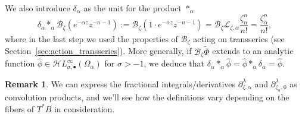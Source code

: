 \documentclass{article}
\newcommand{\singexp}[2]{\mathcal{H}L^\infty_{#1, #2}}
\newcommand{\singexpalg}[1]{\singexp{#1}{\bullet}}
\newcommand{\fracderiv}[3]{\partial^{#1}_{#2, #3}}
\newcommand{\laplace}{\mathcal{L}}
\newcommand{\borel}{\mathcal{B}}
\theoremstyle{definition}
\newtheorem{remark}[definition]{Remark}
\theoremstyle{plain}
\begin{document}
We also introduce $\delta_\alpha$ as the unit for the product $\ast_\alpha$
\[\delta_\alpha\ast_\alpha\borel_\zeta(e^{-\alpha z}z^{-n-1}):=\borel_\zeta(1\cdot e^{-\alpha z} z^{-n-1})=\borel_\zeta\laplace_{\zeta,\alpha}\frac{\zeta_\alpha^n}{n!}=\frac{\zeta_\alpha^n}{n!},\]
where in the last step we used the properties of $\borel_\zeta$ acting on transseries (see Section~\ref{sec:action_transseries}).
More generally, if $\borel_\zeta\tilde{\Phi}$ extends to an analytic function $\hat{\phi}\in\singexpalg{\sigma}(\Omega_\alpha)$ for $\sigma>-1$, we deduce that $\delta_\alpha\ast_\alpha\hat{\phi}=\hat{\phi}\ast_\alpha\delta_\alpha=\hat{\phi}$. 
\begin{remark}
We can express the fractional integrals/derivatives $\fracderiv{\lambda}{\zeta}{\alpha}$ and $\fracderiv{\lambda}{\zeta_\alpha}{0}$ as convolution products, and we’ll see how the definitions vary depending on the fibers of $T^*B$ in consideration. 


\end{remark}
\end{document}
